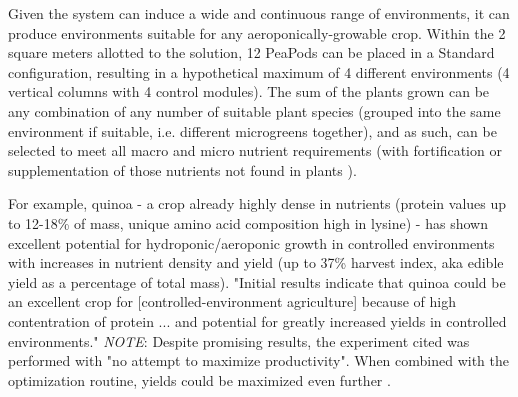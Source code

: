 \documentclass{report}
\begin{document}

Given the system can induce a wide and continuous range of environments, it can produce environments suitable for any aeroponically-growable crop. Within the 2 square meters allotted to the solution, 12 PeaPods can be placed in a Standard configuration, resulting in a hypothetical maximum of 4 different environments (4 vertical columns with 4 control modules). The sum of the plants grown can be any combination of any number of suitable plant species (grouped into the same environment if suitable, i.e. different microgreens together), and as such, can be selected to meet all macro and micro nutrient requirements (with fortification or supplementation of those nutrients not found in plants \cite{plantbased}). 

For example, quinoa - a crop already highly dense in nutrients (protein values up to 12-18\% of mass, unique amino acid composition high in lysine) - has shown excellent potential for hydroponic/aeroponic growth in controlled environments with increases in nutrient density and yield (up to 37\% harvest index, aka edible yield as a percentage of total mass). "Initial results indicate that quinoa could be an excellent crop for [controlled-environment agriculture] because of high contentration of protein ... and potential for greatly increased yields in controlled environments." \textit{NOTE}: Despite promising results, the experiment cited was performed with "no attempt to maximize productivity". When combined with the optimization routine, yields could be maximized even further \cite{quinoa}.
\end{document}
